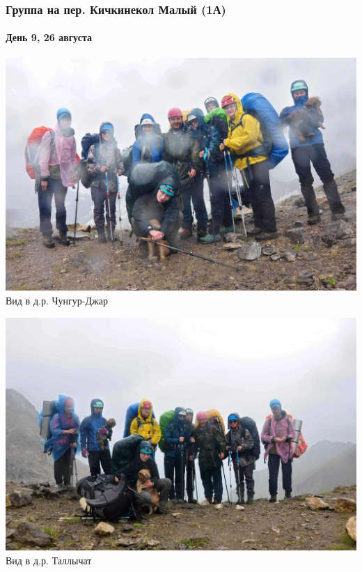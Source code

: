 \begin{frame}
	\frametitle{Группа на пер. Кичкинекол Малый (1А)}
	\framesubtitle{День 9, 26 августа}
	{\tiny
		\begin{minipage}{\fourpicsize}
			\centering
			\includegraphics[width=\textwidth]{../pics/DSC_0239}			
			Вид в д.р. Чунгур-Джар
		\end{minipage}
		\hfill
		\begin{minipage}{\fourpicsize}
			\centering
			\includegraphics[width=\textwidth]{../pics/DSC_0242}			
			Вид в д.р. Таллычат
		\end{minipage}
		\vfill
	}
\end{frame}
